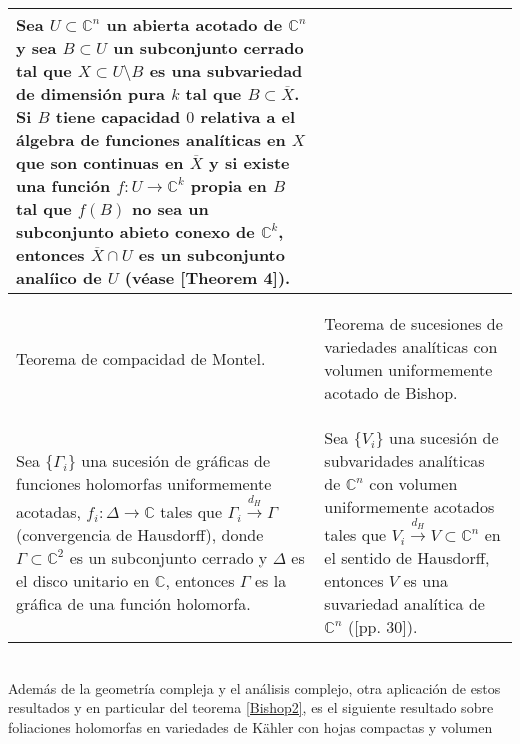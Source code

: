 \documentclass[letterpaper]{report}
\newcommand{\co}{\ensuremath{\mathbb C }}
\newcommand{\con}{\ensuremath{\mathbb{C}^n}}
\begin{document}
\begin{tabular}{| m{5.5cm} | m{5.5cm} |}
                        \vspace{0.1cm}
                        Sea $U\subset\con$ un abierta acotado de $\con$ y sea $B\subset U$ un subconjunto cerrado
                        tal que $X\subset U\setminus B$ es una subvariedad de dimensi\'on pura $k$ tal que $B\subset\overline{X}$. 
                        Si $B$ tiene capacidad $0$ relativa a el \'algebra de funciones anal\'iticas en $X$ que son
                        continuas en $\overline{X}$ y si existe una funci\'on $f:U\rightarrow\co^k$ propia en $B$ tal que $f(B)$ 
                        no sea un subconjunto abieto conexo de $\co^k$, entonces $\overline{X}\cap U$ es un subconjunto anal\'iico
                        de $U$ (v\'ease \cite{Bishop}[Theorem 4]).\\ 
                        \hline 
                \begin{center} 
                        Teorema de compacidad de Montel. 
                \end{center} 
                        & 
                \begin{center}
                Teorema de sucesiones de variedades anal\'iticas con volumen uniformemente acotado de Bishop.
                \end{center}\\
                \hline 
                \vspace{0.1cm}
                Sea $\lbrace\Gamma_i\rbrace$ una sucesi\'on de gr\'aficas de funciones holomorfas uniformemente  
                acotadas, $f_i:\Delta\rightarrow\co$ tales que $\Gamma_i\overset{d_H}\longrightarrow\Gamma$ (convergencia de Hausdorff), 
                donde $\Gamma\subset\co^2$ es un subconjunto cerrado y $\Delta$ es el disco unitario en $\co$, 
                entonces $\Gamma$ es la gr\'afica de una funci\'on holomorfa.  
                        & 
                Sea $\lbrace V_i\rbrace$ una sucesi\'on de subvaridades anal\'iticas de $\con$ con volumen 
                uniformemente acotados tales que $V_i\overset{d_H}\longrightarrow V\subset\con$ en el sentido de Hausdorff, entonces 
                $V$ es una suvariedad anal\'itica de $\con$ (\cite{Stolzenberg}[pp. 30]). \\ \hline 
                
\end{tabular} 
\\
Adem\'as de la geometr\'ia compleja y el an\'alisis complejo, otra aplicaci\'on de estos resultados y en particular del teorema
\ref{Bishop2}, es el siguiente resultado sobre foliaciones holomorfas en variedades de K\"ahler con hojas compactas y volumen 
\end{document}
